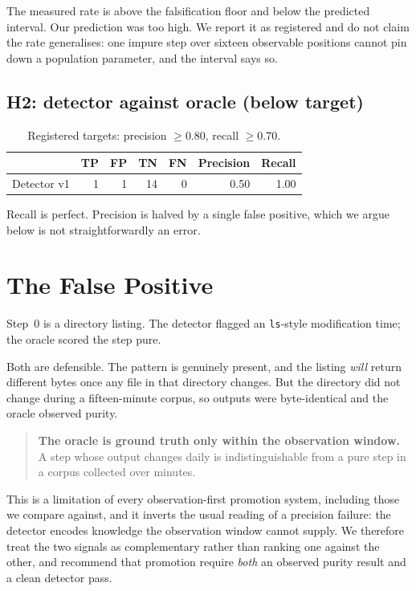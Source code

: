 \documentclass[10pt,conference]{article}
\begin{document}
The measured rate is above the falsification floor and below the predicted
interval. Our prediction was too high. We report it as registered and do not
claim the rate generalises: one impure step over sixteen observable positions
cannot pin down a population parameter, and the interval says so.

\subsection{H2: detector against oracle (below target)}

\begin{table}[h]
\centering
\begin{tabular}{lrrrrrr}
\toprule
& TP & FP & TN & FN & Precision & Recall \\
\midrule
Detector v1 & 1 & 1 & 14 & 0 & 0.50 & 1.00 \\
\bottomrule
\end{tabular}
\caption{Registered targets: precision $\geq 0.80$, recall $\geq 0.70$.}
\end{table}

Recall is perfect. Precision is halved by a single false positive, which we
argue below is not straightforwardly an error.

\section{The False Positive}
\label{sec:fp}

Step~0 is a directory listing. The detector flagged an \texttt{ls}-style
modification time; the oracle scored the step pure.

\figOracleDetector{}

Both are defensible. The pattern is genuinely present, and the listing
\emph{will} return different bytes once any file in that directory changes. But
the directory did not change during a fifteen-minute corpus, so outputs were
byte-identical and the oracle observed purity.

\begin{quote}
\textbf{The oracle is ground truth only within the observation window.} A step
whose output changes daily is indistinguishable from a pure step in a corpus
collected over minutes.
\end{quote}

This is a limitation of every observation-first promotion system, including
those we compare against, and it inverts the usual reading of a precision
failure: the detector encodes knowledge the observation window cannot supply.
We therefore treat the two signals as complementary rather than ranking one
against the other, and recommend that promotion require \emph{both} an observed
purity result and a clean detector pass.
\end{document}
